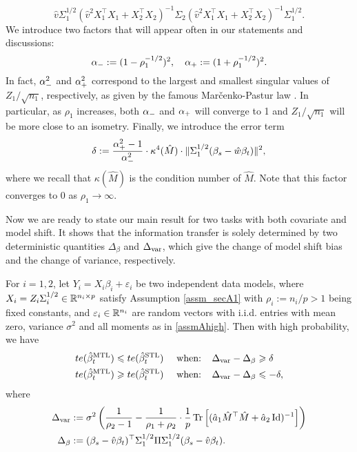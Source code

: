 $$\hat v\Sigma_1^{1/2} (\hat{v}^2 X_1^{\top}X_1 + X_2^{\top}X_2)^{-1} \Sigma_2 (\hat{v}^2 X_1^{\top}X_1 + X_2^{\top}X_2)^{-1}\Sigma_1^{1/2}.$$ 
We introduce two factors that will appear often in our statements and discussions:
$$\alpha_-:=(1- \rho_1^{-1/2})^2,\quad \alpha_+:=(1 + \rho_1^{-1/2})^2.$$ 
In fact, $\alpha_-^2$ and $\alpha_+^2$ correspond to the largest and smallest singular values of $Z_1/\sqrt{n_1}$, respectively, as given by the famous Mar{\v c}enko-Pastur law \cite{MP}. In particular, as $\rho_1$ increases, both $\alpha_-$ and $\alpha_+$ will converge to 1 and $Z_1/\sqrt{n_1}$ will be more close to an isometry. Finally, we introduce the error term  
$$\delta:=\frac{\alpha_+^2 - 1 }{\alpha_-^{2}} \cdot \kappa^4(\hat M)\cdot \|\Sigma_1^{1/2}(\beta_s - \hat{w}\beta_t)\|^2,$$
where we recall that $\kappa(\hat M)$ is the condition number of $\hat M$. Note that this factor converges to 0 as $\rho_1\to \infty$.


Now we are ready to state our main result for two tasks with both covariate and model shift. It shows that the information transfer is solely determined by two deterministic quantities $\Delta_{\beta}$ and $\Delta_{\text{var}}$, which give the change of model shift bias and the change of variance, respectively.



\begin{theorem}\label{thm_model_shift}
For $i=1,2$, let $Y_i = X_i\beta_i + \varepsilon_i$ be two independent data models, where $X_i=Z_i\Sigma_i^{1/2}\in \mathbb{R}^{n_i\times p}$ satisfy Assumption \ref{assm_secA1} with $\rho_i:=n_i/p>1$ being fixed constants, and ${\varepsilon}_i\in \mathbb{R}^{n_i}$ are  random vectors with i.i.d. entries with mean zero, variance $\sigma^2$ and all moments as in \eqref{assmAhigh}.  
	Then with high probability, we have
	\begin{align}
	 	te(\hat{\beta}_{t}^{\text{MTL}}) \leqslant te(\hat{\beta}_t^{\text{STL}}) \quad \text{ when: } \ \ &\Delta_{\text{var}} - \Delta_{\beta} \geqslant  \delta \label{upper}\\
		te(\hat{\beta}_t^{\text{MTL}}) \geqslant te(\hat{\beta}_t^{\text{STL}}) \quad \text{ when: } \ \ &\Delta_{\text{var}} - \Delta_{\beta} \leqslant -\delta, \label{lower}
	\end{align}
	where
	\begin{align*} %
		\Delta_{\vari} &\define {\sigma^2}\bigbrace{\frac{1}{\rho_2 - 1} -  \frac{1}{\rho_1 + \rho_2}\cdot \frac1p \bigtr{(\hat a_1 \hat M^{\top}\hat M + \hat a_2\id)^{-1}} } \\
		\Delta_{\beta} &\define (\beta_s - \hat{v}\beta_t)^{\top} \Sigma_1^{1/2} \Pi \Sigma_1^{1/2} (\beta_s - \hat{v}\beta_t).
	\end{align*}
\end{theorem}

